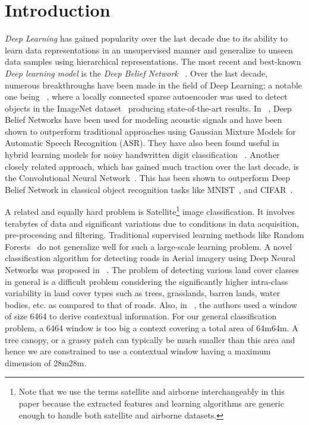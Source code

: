 \documentclass[11pt,a4paper]{article}
\begin{document}
\vspace{20 mm}





\section{Introduction}
\emph{Deep Learning} has gained popularity over the last decade due to its ability to learn data representations in an unsupervised manner and generalize to unseen data samples using hierarchical representations. The most recent and best-known \emph{Deep learning model} is the \emph{Deep Belief Network} ~\cite{Hinton06afast}. Over the last decade, numerous breakthroughs have been made in the field of Deep Learning; a notable one being ~\cite{QuocCCDN12}, where a locally connected sparse autoencoder was used to detect objects in the ImageNet dataset~\cite{Deng09imagenet} producing state-of-the-art results. In ~\cite{MohamedDH12}, Deep Belief Networks have been used for modeling acoustic signals and have been shown to outperform traditional approaches using Gaussian Mixture Models for Automatic Speech Recognition (ASR). They have also been found useful in hybrid learning models for noisy handwritten digit classification ~\cite{basuesann2015}. Another closely related approach, which has gained much traction over the last decade, is the Convolutional Neural Network~\cite{Lecun98gradient-basedlearning}. This has been shown to outperform Deep Belief Network in classical object recognition tasks like MNIST~\cite{mnist}, and CIFAR~\cite{Krizhevsky09learningmultiple}.

A related and equally hard problem is Satellite\footnote{Note that we use the terms satellite and airborne interchangeably in this paper because the extracted features and  learning algorithms are generic enough to handle both satellite and airborne datasets.} image classification. It involves terabytes of data and significant variations due to conditions in data acquisition, pre-processing and filtering. Traditional supervised learning methods like Random Forests~\cite{Breiman:2001} do not generalize well for such a large-scale learning problem. A novel classification algorithm for detecting roads in Aerial imagery using Deep Neural Networks was proposed in ~\cite{MnihHinton2010}. The problem of detecting various land cover classes in general is a difficult problem considering the significantly higher intra-class variability in land cover types such as trees, grasslands, barren lands, water bodies, etc. as compared to that of roads. Also, in ~\cite{MnihHinton2010}, the authors used a window of size 6464 to derive contextual information. For our general classification problem, a 6464 window is too big a context covering a total area of 64m64m. A tree canopy, or a grassy patch can typically be much smaller than this area and hence we are constrained to use a contextual window having a maximum dimension of 28m28m.
\end{document}
